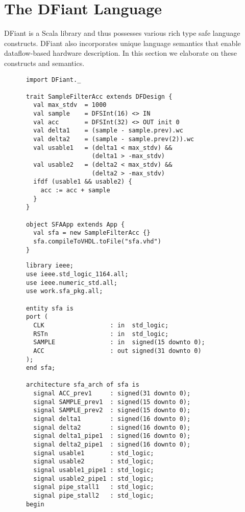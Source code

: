 \section{The DFiant Language}
\label{sec:dfiant}
DFiant is a Scala library and thus possesses various rich type safe language constructs. DFiant also incorporates unique language semantics that enable dataflow-based hardware description. In this section we elaborate on these constructs and semantics.

\begin{table*}[t!]
  \centering
  \begin{minipage}[t][6.8cm][t]{0.46\linewidth}
    \centering
    \begin{verbatim}
      import DFiant._
      
      trait SampleFilterAcc extends DFDesign {
        val max_stdv  = 1000
        val sample    = DFSInt(16) <> IN
        val acc       = DFSInt(32) <> OUT init 0
        val delta1    = (sample - sample.prev).wc
        val delta2    = (sample - sample.prev(2)).wc
        val usable1   = (delta1 < max_stdv) && 
                        (delta1 > -max_stdv)
        val usable2   = (delta2 < max_stdv) && 
                        (delta2 > -max_stdv)
        ifdf (usable1 && usable2) {
          acc := acc + sample
        }
      }    
      
      object SFAApp extends App {
        val sfa = new SampleFilterAcc {}
        sfa.compileToVHDL.toFile("sfa.vhd")
      }
    \end{verbatim}
    \label{fig:AES_Compare_Graph}
  \end{minipage}
  \hfill
  \begin{minipage}[t][22cm][t]{0.51\linewidth}
    \centering
    \begin{verbatim}
      library ieee;
      use ieee.std_logic_1164.all;
      use ieee.numeric_std.all;
      use work.sfa_pkg.all;
      
      entity sfa is
      port (
        CLK                  : in  std_logic;
        RSTn                 : in  std_logic;
        SAMPLE               : in  signed(15 downto 0);
        ACC                  : out signed(31 downto 0)
      );
      end sfa;
      
      architecture sfa_arch of sfa is
        signal ACC_prev1     : signed(31 downto 0);
        signal SAMPLE_prev1  : signed(15 downto 0);
        signal SAMPLE_prev2  : signed(15 downto 0);
        signal delta1        : signed(16 downto 0);
        signal delta2        : signed(16 downto 0);
        signal delta1_pipe1  : signed(16 downto 0);
        signal delta2_pipe1  : signed(16 downto 0);
        signal usable1       : std_logic;
        signal usable2       : std_logic;
        signal usable1_pipe1 : std_logic;
        signal usable2_pipe1 : std_logic;
        signal pipe_stall1   : std_logic;
        signal pipe_stall2   : std_logic;
      begin
      

\end{verbatim}
\end{minipage}
\end{table*}
